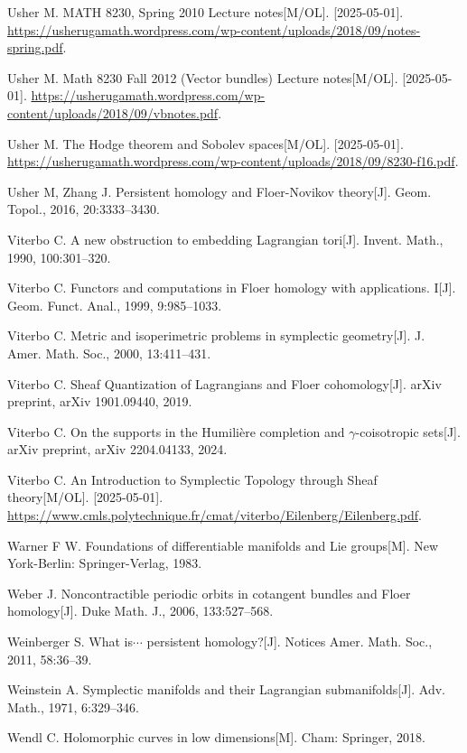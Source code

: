 \begin{enumerate}[label={[\arabic*]},leftmargin=3.2em,itemsep=2pt,parsep=0pt]
  \item Usher M. MATH 8230, Spring 2010 Lecture notes[M/OL]. [2025-05-01].
        \url{https://usherugamath.wordpress.com/wp-content/uploads/2018/09/notes-spring.pdf}.
  \item Usher M. Math 8230 Fall 2012 (Vector bundles) Lecture notes[M/OL]. [2025-05-01].
        \url{https://usherugamath.wordpress.com/wp-content/uploads/2018/09/vbnotes.pdf}.
  \item Usher M. The Hodge theorem and Sobolev spaces[M/OL]. [2025-05-01].
        \url{https://usherugamath.wordpress.com/wp-content/uploads/2018/09/8230-f16.pdf}.
  \item Usher M, Zhang J. Persistent homology and Floer-Novikov theory[J]. Geom. Topol.,
        2016, 20:3333--3430.
  \item Viterbo C. A new obstruction to embedding Lagrangian tori[J]. Invent. Math., 1990,
        100:301--320.
  \item Viterbo C. Functors and computations in Floer homology with applications. I[J].
        Geom. Funct. Anal., 1999, 9:985--1033.
  \item Viterbo C. Metric and isoperimetric problems in symplectic geometry[J]. J. Amer.
        Math. Soc., 2000, 13:411--431.
  \item Viterbo C. Sheaf Quantization of Lagrangians and Floer cohomology[J]. arXiv
        preprint, arXiv 1901.09440, 2019.
  \item Viterbo C. On the supports in the Humilière completion and $\gamma$-coisotropic
        sets[J]. arXiv preprint, arXiv 2204.04133, 2024.
  \item Viterbo C. An Introduction to Symplectic Topology through Sheaf theory[M/OL].
        [2025-05-01].
        \url{https://www.cmls.polytechnique.fr/cmat/viterbo/Eilenberg/Eilenberg.pdf}.
  \item Warner F W. Foundations of differentiable manifolds and Lie groups[M]. New
        York-Berlin: Springer-Verlag, 1983.
  \item Weber J. Noncontractible periodic orbits in cotangent bundles and Floer homology[J].
        Duke Math. J., 2006, 133:527--568.
  \item Weinberger S. What is$\cdots$ persistent homology?[J]. Notices Amer. Math. Soc.,
        2011, 58:36--39.
  \item Weinstein A. Symplectic manifolds and their Lagrangian submanifolds[J]. Adv. Math.,
        1971, 6:329--346.
  \item Wendl C. Holomorphic curves in low dimensions[M]. Cham: Springer, 2018.

\end{enumerate}
